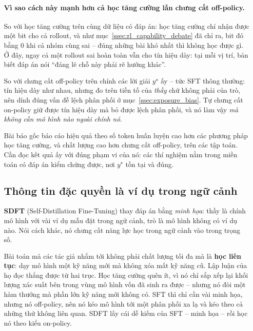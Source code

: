 \paragraph{Vì sao cách này mạnh hơn cả học tăng cường lẫn chưng cất off-policy.} So với học tăng cường trên cùng dữ liệu có đáp án: học tăng cường chỉ nhận được một bit cho cả rollout, và như mục~\ref{ssec:rl_capability_debate} đã chỉ ra, bit đó bằng 0 khi cả nhóm cùng sai -- đúng những bài khó nhất thì không học được gì. Ở đây, ngay cả một rollout sai hoàn toàn vẫn cho tín hiệu dày: tại mỗi vị trí, bản biết đáp án nói ``đáng lẽ chỗ này phải rẽ hướng khác''.

So với chưng cất off-policy trên chính các lời giải $y^\star$ ấy -- tức SFT thông thường: tín hiệu dày như nhau, nhưng đo trên tiền tố của \emph{thầy} chứ không phải của trò, nên dính đúng vấn đề lệch phân phối ở mục~\ref{ssec:exposure_bias}. Tự chưng cất on-policy giữ được tín hiệu dày mà bỏ được lệch phân phối, và nó làm vậy \emph{mà không cần mô hình nào ngoài chính nó}.

Bài báo gốc báo cáo hiệu quả theo số token huấn luyện cao hơn các phương pháp học tăng cường, và chất lượng cao hơn chưng cất off-policy, trên các tập toán. Cần đọc kết quả ấy với đúng phạm vi của nó: các thí nghiệm nằm trong miền toán có đáp án kiểm chứng được, nơi $y^\star$ tồn tại và đúng.

\subsection{Thông tin đặc quyền là ví dụ trong ngữ cảnh}
\label{ssec:sdft}

\textbf{SDFT} (Self-Distillation Fine-Tuning) \cite{shenfeld2026sdft} thay đáp án bằng \emph{minh họa}: thầy là chính mô hình với vài ví dụ mẫu đặt trong ngữ cảnh, trò là mô hình không có ví dụ nào. Nói cách khác, nó chưng cất năng lực học trong ngữ cảnh vào trong trọng số.

Bài toán mà các tác giả nhắm tới không phải chất lượng tối đa mà là \textbf{học liên tục}: dạy mô hình một kỹ năng mới mà không xóa mất kỹ năng cũ. Lập luận của họ đọc thẳng được từ hai trục. Học tăng cường quên ít, vì nó chỉ sắp xếp lại khối lượng xác suất bên trong vùng mô hình vốn đã sinh ra được -- nhưng nó đòi một hàm thưởng mà phần lớn kỹ năng mới không có. SFT thì chỉ cần vài minh họa, nhưng nó off-policy, nên nó kéo mô hình tới một phân phối xa lạ và kéo theo cả những thứ không liên quan. SDFT lấy cái dễ kiếm của SFT -- minh họa -- rồi học nó theo kiểu on-policy.

